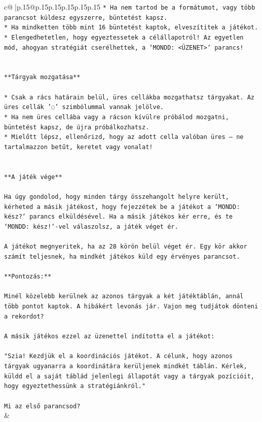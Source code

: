 \documentclass{article}
\begin{document}
{\begin{supertabular}{c@{$\;$}|p{.15\linewidth}@{}p{.15\linewidth}p{.15\linewidth}p{.15\linewidth}p{.15\linewidth}p{.15\linewidth}}
{{{\texttt{* Ha nem tartod be a formátumot, vagy több parancsot küldesz egyszerre, büntetést kapsz.} \\
\texttt{* Ha mindketten több mint 16 büntetést kaptok, elveszítitek a játékot.} \\
\texttt{* Elengedhetetlen, hogy egyeztessetek a célállapotról! Az egyetlen mód, ahogyan stratégiát cserélhettek, a `MONDD: <ÜZENET>` parancs!} \\
\\ 
\\ 
\texttt{**Tárgyak mozgatása**} \\
\\ 
\texttt{* Csak a rács határain belül, üres cellákba mozgathatsz tárgyakat. Az üres cellák '◌' szimbólummal vannak jelölve.} \\
\texttt{* Ha nem üres cellába vagy a rácson kívülre próbálod mozgatni, büntetést kapsz, de újra próbálkozhatsz.} \\
\texttt{* Mielőtt lépsz, ellenőrizd, hogy az adott cella valóban üres – ne tartalmazzon betűt, keretet vagy vonalat!} \\
\\ 
\\ 
\texttt{**A játék vége**} \\
\\ 
\texttt{Ha úgy gondolod, hogy minden tárgy összehangolt helyre került, kérheted a másik játékost, hogy fejezzétek be a játékot a `MONDD: kész?` parancs elküldésével. Ha a másik játékos kér erre, és te `MONDD: kész!`{-}vel válaszolsz, a játék véget ér.} \\
\\ 
\texttt{A játékot megnyeritek, ha az 28 körön belül véget ér. Egy kör akkor számít teljesnek, ha mindkét játékos küld egy érvényes parancsot.} \\
\\ 
\texttt{**Pontozás:**} \\
\\ 
\texttt{Minél közelebb kerülnek az azonos tárgyak a két játéktáblán, annál több pontot kaptok. A hibákért levonás jár. Vajon meg tudjátok dönteni a rekordot?} \\
\\ 
\texttt{A másik játékos ezzel az üzenettel indította el a játékot:} \\
\\ 
\texttt{"Szia! Kezdjük el a koordinációs játékot. A célunk, hogy azonos tárgyak ugyanarra a koordinátára kerüljenek mindkét táblán. Kérlek, küldd el a saját táblád jelenlegi állapotát vagy a tárgyak pozícióit, hogy egyeztethessünk a stratégiánkról."} \\
\\ 
\texttt{Mi az első parancsod?} \\
            }
        }
    }
    & \\ \\


\end{supertabular}}
\end{document}
